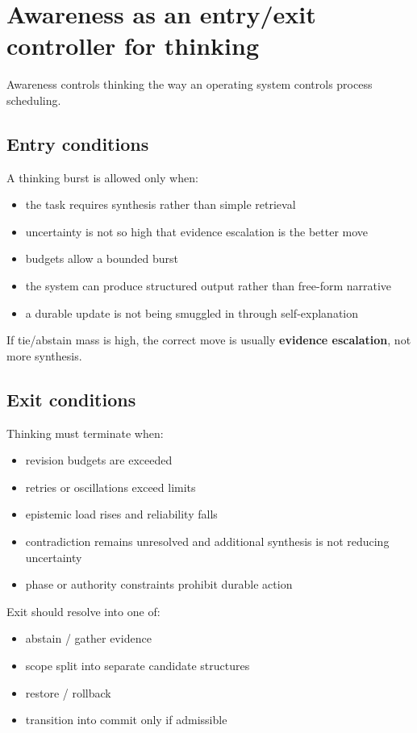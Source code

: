 \documentclass[11pt]{article}
\begin{document}
\section{Awareness as an entry/exit controller for thinking}
Awareness controls thinking the way an operating system controls process scheduling.

\subsection{Entry conditions}
A thinking burst is allowed only when:
\begin{itemize}[leftmargin=2em]
  \item the task requires synthesis rather than simple retrieval
  \item uncertainty is not so high that evidence escalation is the better move
  \item budgets allow a bounded burst
  \item the system can produce structured output rather than free-form narrative
  \item a durable update is not being smuggled in through self-explanation
\end{itemize}

If tie/abstain mass is high, the correct move is usually \textbf{evidence escalation}, not more synthesis.

\subsection{Exit conditions}
Thinking must terminate when:
\begin{itemize}[leftmargin=2em]
  \item revision budgets are exceeded
  \item retries or oscillations exceed limits
  \item epistemic load rises and reliability falls
  \item contradiction remains unresolved and additional synthesis is not reducing uncertainty
  \item phase or authority constraints prohibit durable action
\end{itemize}

Exit should resolve into one of:
\begin{itemize}[leftmargin=2em]
  \item abstain / gather evidence
  \item scope split into separate candidate structures
  \item restore / rollback
  \item transition into commit only if admissible
\end{itemize}
\end{document}
